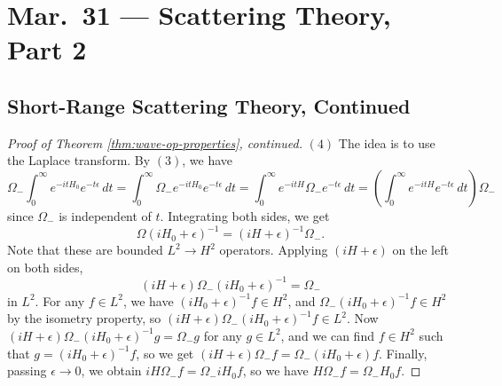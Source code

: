 \chapter{Mar.~31 --- Scattering Theory, Part 2}

\section{Short-Range Scattering Theory, Continued}
\begin{proof}[Proof of Theorem \ref{thm:wave-op-properties}, continued]
  $(4)$ The idea is to use the Laplace transform.
  By $(3)$, we have
  \[
    \Omega_- \int_0^\infty e^{-itH_0} e^{-t\epsilon}\, dt
    = \int_0^\infty \Omega_- e^{-itH_0} e^{-t\epsilon}\, dt
    = \int_0^\infty e^{-itH} \Omega_- e^{-t\epsilon}\, dt
    = \left(\int_0^\infty e^{-itH} e^{-t\epsilon}\, dt\right) \Omega_-
  \]
  since $\Omega_-$ is independent of $t$.
  Integrating both sides, we get
  \[
    \Omega(iH_0 + \epsilon)^{-1}
    = (iH + \epsilon)^{-1} \Omega_-.
  \]
  Note that these are bounded $L^2 \to H^2$
  operators. Applying $(iH + \epsilon)$ on the left
  on both sides,
  \[
    (i H + \epsilon) \Omega_- (i H_0 + \epsilon)^{-1}
    = \Omega_-
  \]
  in $L^2$. For any $f \in L^2$, we have
  $(i H_0 + \epsilon)^{-1} f \in H^2$, and
  $\Omega_- (i H_0 + \epsilon)^{-1} f \in H^2$
  by the isometry property, so
  $(i H + \epsilon) \Omega_- (i H_0 + \epsilon)^{-1} f \in L^2$.
  Now $(i H + \epsilon) \Omega_- (i H_0 + \epsilon)^{-1} g = \Omega_- g$
  for any $g \in L^2$, and we can find $f \in H^2$
  such that $g = (i H_0 + \epsilon)^{-1} f$, so
  we get
  $(iH + \epsilon) \Omega_- f = \Omega_- (iH_0 + \epsilon) f$.
  Finally, passing $\epsilon \to 0$, we
  obtain $iH \Omega_- f = \Omega_- iH_0 f$,
  so we have $H \Omega_- f = \Omega_- H_0 f$.


\end{proof}
